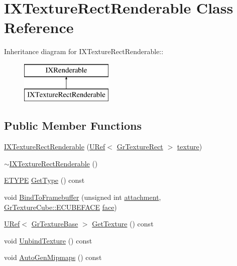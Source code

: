 \hypertarget{class_i_x_texture_rect_renderable}{
\section{IXTextureRectRenderable Class Reference}
\label{class_i_x_texture_rect_renderable}
}
Inheritance diagram for IXTextureRectRenderable::\begin{figure}[H]
\begin{center}
\leavevmode
\includegraphics[height=2cm]{class_i_x_texture_rect_renderable}
\end{center}
\end{figure}
\subsection*{Public Member Functions}
\begin{CompactItemize}
\item 
\hyperlink{class_i_x_texture_rect_renderable_7392e5323e2e1ef5c3eaebe473136ffe}{IXTextureRectRenderable} (\hyperlink{class_u_ref}{URef}$<$ \hyperlink{class_gr_texture_rect}{GrTextureRect} $>$ \hyperlink{glext__bak_8h_8f486379aef534669f4f06f515e7ce6c}{texture})
\item 
\hyperlink{class_i_x_texture_rect_renderable_8b6f70bd5ca981daf3109d9994421fd8}{$\sim$IXTextureRectRenderable} ()
\item 
\hyperlink{class_i_x_renderable_a83cb64592404acfb99afbc55a4ed8a8}{ETYPE} \hyperlink{class_i_x_texture_rect_renderable_ad98e9d375ae185a8472381bae5d646e}{GetType} () const 
\item 
void \hyperlink{class_i_x_texture_rect_renderable_0a40ad04c48447177dfda83ff287474a}{BindToFramebuffer} (unsigned int \hyperlink{glext__bak_8h_d8f97111cc6514af5f352219d1cceb40}{attachment}, \hyperlink{class_gr_texture_cube_49c6f83c73520edfce04f4eb5dcfe6a0}{GrTextureCube::ECUBEFACE} \hyperlink{glext_8h_676ca580c460c0154eb58200433d2a9e}{face})
\item 
\hyperlink{class_u_ref}{URef}$<$ \hyperlink{class_gr_texture_base}{GrTextureBase} $>$ \hyperlink{class_i_x_texture_rect_renderable_b257ec75b2b8544f82d4396f3d84a49a}{GetTexture} () const 
\item 
void \hyperlink{class_i_x_texture_rect_renderable_fd7cf5412255a00c33d84c17a22cbefa}{UnbindTexture} () const 
\item 
void \hyperlink{class_i_x_texture_rect_renderable_3f97d83058590ba5fc2f5f213931fcf1}{AutoGenMipmaps} () const 
\end{CompactItemize}


